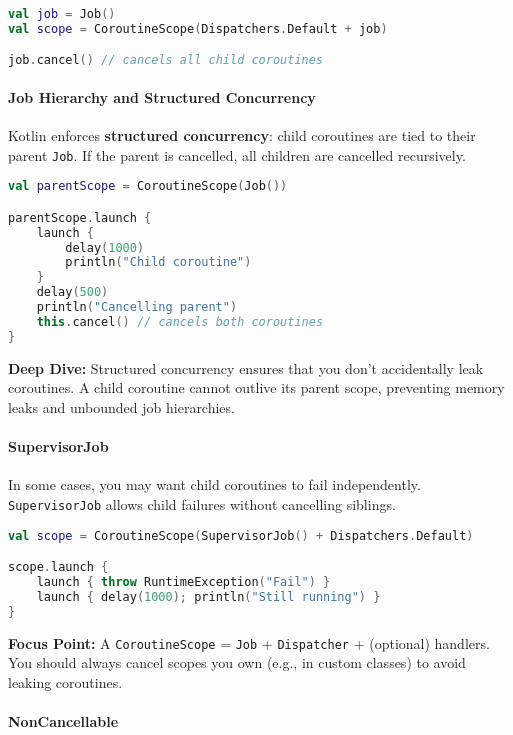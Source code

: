 \documentclass[a4paper,12pt]{article}
\begin{document}
\begin{lstlisting}[language=Kotlin]
val job = Job()
val scope = CoroutineScope(Dispatchers.Default + job)

job.cancel() // cancels all child coroutines
\end{lstlisting}

\paragraph{Job Hierarchy and Structured Concurrency}

Kotlin enforces \textbf{structured concurrency}: child coroutines are tied to their parent \texttt{Job}. If the parent is cancelled, all children are cancelled recursively.

\begin{lstlisting}[language=Kotlin]
val parentScope = CoroutineScope(Job())

parentScope.launch {
    launch {
        delay(1000)
        println("Child coroutine")
    }
    delay(500)
    println("Cancelling parent")
    this.cancel() // cancels both coroutines
}
\end{lstlisting}

\textbf{Deep Dive:} Structured concurrency ensures that you don't accidentally leak coroutines. A child coroutine cannot outlive its parent scope, preventing memory leaks and unbounded job hierarchies.

\paragraph{SupervisorJob}

In some cases, you may want child coroutines to fail independently. \texttt{SupervisorJob} allows child failures without cancelling siblings.

\begin{lstlisting}[language=Kotlin]
val scope = CoroutineScope(SupervisorJob() + Dispatchers.Default)

scope.launch {
    launch { throw RuntimeException("Fail") }
    launch { delay(1000); println("Still running") }
}
\end{lstlisting}

\textbf{Focus Point:} A \texttt{CoroutineScope} = \texttt{Job} + \texttt{Dispatcher} + (optional) handlers. You should always cancel scopes you own (e.g., in custom classes) to avoid leaking coroutines.

\paragraph{NonCancellable}
\end{document}
